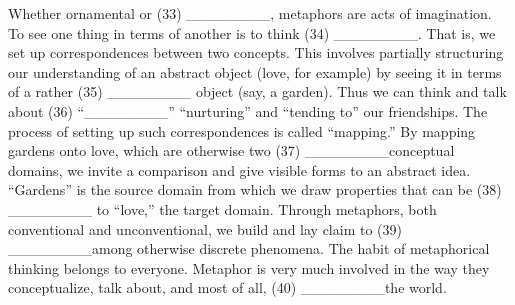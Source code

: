 \documentclass[UTF8,11pt]{ctexart}
\begin{document}
Whether ornamental or (33) \_\_\_\_\_\_\_\_, metaphors are acts of imagination. To see one thing in terms of another is to think (34) \_\_\_\_\_\_\_\_. That is, we set up correspondences between two concepts. This involves partially structuring our understanding of an abstract object (love, for example) by seeing it in terms of a rather (35) \_\_\_\_\_\_\_\_ object (say, a garden). Thus we can think and talk about (36) “\_\_\_\_\_\_\_\_” “nurturing” and “tending to” our friendships. The process of setting up such correspondences is called “mapping.” By mapping gardens onto love, which are otherwise two (37) \_\_\_\_\_\_\_\_conceptual domains, we invite a comparison and give visible forms to an abstract idea. “Gardens” is the source domain from which we draw properties that can be (38) \_\_\_\_\_\_\_\_ to “love,” the target domain. Through metaphors, both conventional and unconventional, we build and lay claim to (39) \_\_\_\_\_\_\_\_among otherwise discrete phenomena. The habit of metaphorical thinking belongs to everyone. Metaphor is very much involved in the way they conceptualize, talk about, and most of all, (40) \_\_\_\_\_\_\_\_the world.
\end{document}
